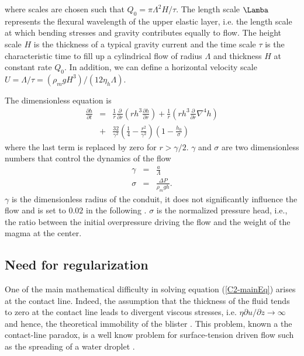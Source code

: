 where scales  are chosen  such that $Q_0  = \pi\Lambda^2  H/\tau$. The
length scale $\Lamba$ represents the  flexural wavelength of the upper
elastic layer,  i.e. the  length scale at  which bending  stresses and
gravity  contributes equally  to flow.   The height  scale $H$  is the
thickness of  a typical gravity current  and the time scale  $\tau$ is
the  characteristic time  to  fill  up a  cylindrical  flow of  radius
$\Lambda$ and thickness  $H$ at constant rate $Q_0$.   In addition, we
can       define        a       horizontal        velocity       scale
$U=\Lambda/\tau=\left(\rho_m           g           H^3\right)/\left(12
  \eta_h\Lambda\right)$.

The dimensionless equation is
\begin{eqnarray}
  \frac{\partial h}{\partial t}& =&\frac{1}{ r}
                                    \frac{\partial}{\partial r}  \left( rh^3  \frac{\partial h}{\partial
                                    r}\right)+\frac{1}{ r} \left( rh^3
                                    \frac{\partial}{\partial
                                    r}\nabla^4h\right)\nonumber\\
                               &+&
                                   \frac{32}{\gamma^{2}}\left(\frac{1}{4}-\frac{r^{2}}{\gamma^{2}}\right)\left(1-\frac{h_0}{\sigma}\right)
                                   \label{C2-mainEq}
\end{eqnarray}
where the last term is replaced by zero for $r>\gamma/2$. $\gamma$ and
$\sigma$ are  two dimensionless numbers  that control the  dynamics of
the flow
\begin{eqnarray}
  \gamma &=& \frac{a}{\Lambda}\\
  \sigma &=& \frac{\Delta P}{\rho_m g h}.
\end{eqnarray}
$\gamma$  is the  dimensionless radius  of  the conduit,  it does  not
significantly influence the flow and is set to $0.02$ in the following
\citep{Michaut:2009jx,Michaut:2011kg}.   $\sigma$  is  the  normalized
pressure  head,  i.e.,  the  ratio between  the  initial  overpressure
driving the flow and the weight of the magma at the center.
	 
\subsection{Need for regularization}
\label{C2-sec:need-regularization}

One  of   the  main   mathematical  difficulty  in   solving  equation
(\ref{C2-mainEq}) arises at the  contact line.  Indeed, the assumption
that the  thickness of  the fluid  tends to zero  at the  contact line
leads       to       divergent      viscous       stresses,       i.e.
$\eta  \partial   u/\partial  z\rightarrow  \infty$  and   hence,  the
theoretical         immobility          of         the         blister
\citep{Flitton:1999iv,Lister:2013ia,Anonymous:QWXp_4JV}. This problem,
known  a  the  contact-line  paradox,  is  a  well  know  problem  for
surface-tension driven flow  such as the spreading of  a water droplet
\citep{Bertozzi:1998wz,Snoeijer:2013cm}.

